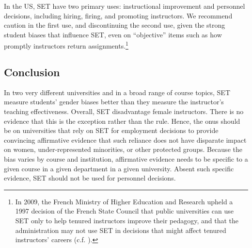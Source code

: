 \documentclass[12pt]{article}
\begin{document}
In the US, SET have two primary uses: 
instructional improvement and personnel decisions, including hiring, firing, and 
promoting instructors. 
We recommend caution in the first use, and discontinuing the second use, 
given the strong student biases that 
influence SET, even on ``objective'' items such as how promptly instructors return
assignments.\footnote{%
  In 2009, the French Ministry of Higher Education and Research upheld a 1997 
  decision of the French State Council that public universities can use SET only to help 
  tenured instructors improve their pedagogy, and that the administration may not use 
  SET in decisions that might affect  tenured instructors' careers (c.f. \citet{Boring2015ofce}). 
}

\subsection{Conclusion}
In two very different universities and in a broad range of course topics, 
SET measure students' gender biases better than they 
measure the instructor's teaching effectiveness.
Overall, SET disadvantage female instructors.
There is no evidence that this is the exception rather than the rule.
Hence, the onus should be on universities 
that rely on SET for employment decisions to provide convincing affirmative evidence
that such reliance does not have disparate impact on women,
under-represented minorities, or other protected groups.
Because the bias varies by course and institution, affirmative evidence needs to
be specific to a given course in a given department in a given university.
Absent such specific evidence, SET should not be used for personnel decisions.



\end{document}
